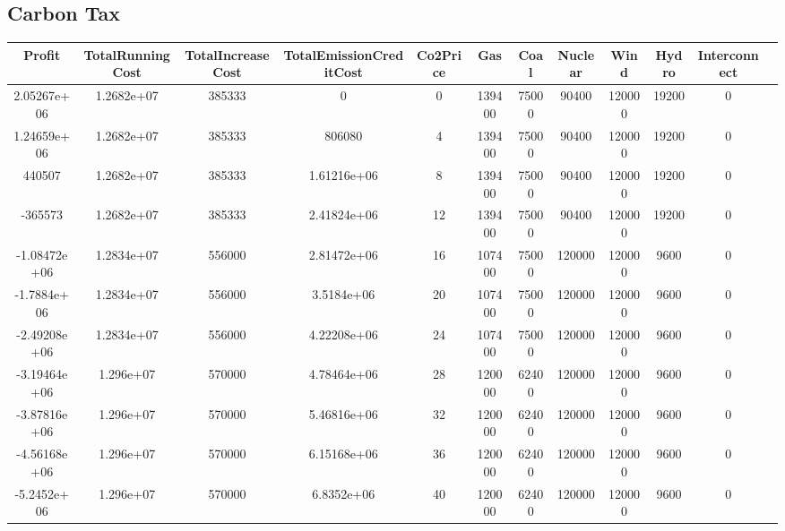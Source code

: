 \documentclass[twocolumn]{article}
\begin{document}
\begin{landscape}
\section{Carbon Tax} \label{sec:app-tax}
    \begin{table}[H]
    	\centering
\begin{tabular}{cccccccccccc}
\hline
Profit       & TotalRunningCost & TotalIncreaseCost & TotalEmissionCreditCost & Co2Price & Gas    & Coal  & Nuclear & Wind   & Hydro & Interconnect &  \\ 
\hline
2.05267e+06  & 1.2682e+07       & 385333            & 0                       & 0        & 139400 & 75000 & 90400   & 120000 & 19200 & 0            &  \\
1.24659e+06  & 1.2682e+07       & 385333            & 806080                  & 4        & 139400 & 75000 & 90400   & 120000 & 19200 & 0            &  \\
440507       & 1.2682e+07       & 385333            & 1.61216e+06             & 8        & 139400 & 75000 & 90400   & 120000 & 19200 & 0            &  \\
-365573      & 1.2682e+07       & 385333            & 2.41824e+06             & 12       & 139400 & 75000 & 90400   & 120000 & 19200 & 0            &  \\
-1.08472e+06 & 1.2834e+07       & 556000            & 2.81472e+06             & 16       & 107400 & 75000 & 120000  & 120000 & 9600  & 0            &  \\
-1.7884e+06  & 1.2834e+07       & 556000            & 3.5184e+06              & 20       & 107400 & 75000 & 120000  & 120000 & 9600  & 0            &  \\
-2.49208e+06 & 1.2834e+07       & 556000            & 4.22208e+06             & 24       & 107400 & 75000 & 120000  & 120000 & 9600  & 0            &  \\
-3.19464e+06 & 1.296e+07        & 570000            & 4.78464e+06             & 28       & 120000 & 62400 & 120000  & 120000 & 9600  & 0            &  \\
-3.87816e+06 & 1.296e+07        & 570000            & 5.46816e+06             & 32       & 120000 & 62400 & 120000  & 120000 & 9600  & 0            &  \\
-4.56168e+06 & 1.296e+07        & 570000            & 6.15168e+06             & 36       & 120000 & 62400 & 120000  & 120000 & 9600  & 0            &  \\
-5.2452e+06  & 1.296e+07        & 570000            & 6.8352e+06              & 40       & 120000 & 62400 & 120000  & 120000 & 9600  & 0            &  \\

\end{tabular}
\end{table}
\end{landscape}
\end{document}
